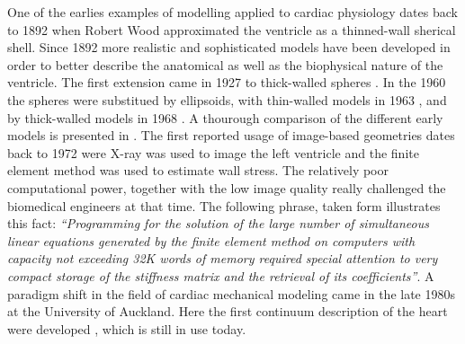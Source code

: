 One of the earlies examples of modelling applied to cardiac
physiology dates back to 1892 when Robert Wood approximated the
ventricle as a thinned-wall sherical shell.
Since 1892 more realistic and sophisticated models have been developed
in order to better describe the anatomical as well as the biophysical
nature of the ventricle. The first extension came in 1927 to
thick-walled spheres \cite{love2013treatise}. In the 1960 the spheres
were substitued by ellipsoids, with thin-walled models in 1963
\cite{sandler1963left}, and by thick-walled models in 1968
\cite{wong1968stress}. A thourough comparison of the different early
models  is presented in \cite{huisman1980comparison}. The first
reported usage of image-based geometries dates back to 1972
\cite{gould1972vivo} were X-ray was used to image the left ventricle
and the finite element method was used to estimate wall stress. The relatively
poor computational power, together with the low image quality really
challenged the biomedical engineers at that time. The following
phrase, taken form \cite{heethaar1977computer} illustrates this fact:  
\emph{``Programming for the solution of the large number of
  simultaneous linear equations generated by the finite element method
  on computers with capacity not exceeding 32K words of memory
  required special attention to very compact storage of the
  stiffness matrix and the retrieval of its coefficients''}.
A paradigm shift in the field of cardiac mechanical modeling came in
the late 1980s at the University of Auckland. Here the first  continuum
description of the heart were developed \cite{hunter1988analysis},
which is still in use today. 



